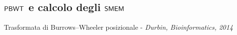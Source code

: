 \documentclass[]{beamer}
\def\PBWT{\mbox{\rm {\sf PBWT}}}
\def\SMEM{\mbox{\rm {\sf SMEM}}}
\begin{document}
\subsection{$\PBWT$ e calcolo degli $\SMEM$}
\begin{frame}{{\small{Trasformata di Burrows--Wheeler posizionale -}} {\scriptsize{\textit{Durbin, Bioinformatics,
               2014}}}}
\end{frame}
\end{document}
